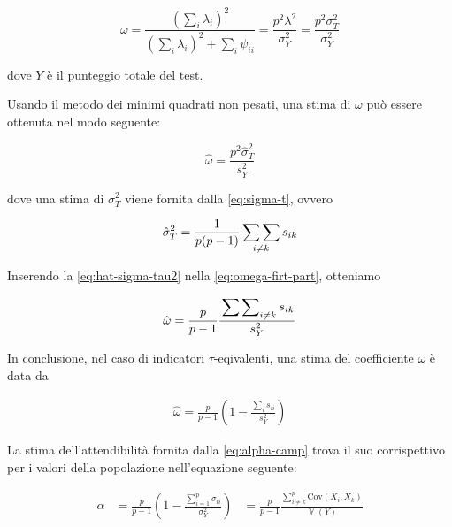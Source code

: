 \documentclass[
  11pt,
]{krantz}
\DeclareMathOperator{\V}{\mathbb{V}} %
\theoremstyle{definition}
\theoremstyle{definition}
\theoremstyle{definition}
\theoremstyle{definition}
\theoremstyle{remark}
\begin{document}
\[
\omega = \frac{\left( \sum_i \lambda_i \right)^2}{\left( \sum_i
    \lambda_i \right)^2  + \sum_i \psi_{ii}} = \frac{p^2 \lambda^2}{\sigma^2_Y} = \frac{p^2 \sigma_T^2}{\sigma_Y^2}
\]

dove \(Y\) è il punteggio totale del test.

Usando il metodo dei minimi quadrati non pesati, una stima di \(\omega\) può essere ottenuta nel modo seguente:

\begin{equation}
\hat{\omega} = \frac{p^2 \hat{\sigma}_T^2}{s_Y^2}
\label{eq:omega-firt-part}
\end{equation}

dove una stima di \(\sigma_T^2\) viene fornita dalla \eqref{eq:sigma-t}, ovvero

\begin{equation}
\hat{\sigma}_T^2 = \frac{1}{p(p-1)} \sideset{}{} {\sum \sum}_{i \neq k} s_{ik}
\label{eq:hat-sigma-tau2}
\end{equation}

Inserendo la \eqref{eq:hat-sigma-tau2} nella \eqref{eq:omega-firt-part}, otteniamo

\begin{equation}
\hat{\omega} = \frac{p}{p-1}\frac{\sideset{}{} {\sum \sum}_{i \neq k} s_{ik}}{s_Y^2}
\end{equation}

In conclusione, nel caso di indicatori \(\tau\)-eqivalenti, una stima del coefficiente \(\omega\) è data da

\begin{equation}
\begin{aligned}
\hat{\omega}
 = \frac{p}{p-1}\left(1-\frac{\sum_i s_{ii}}{s_Y^2}\right)
\label{eq:alpha-camp}
\end{aligned}
\end{equation}

La stima dell'attendibilità fornita dalla \eqref{eq:alpha-camp} trova il suo corrispettivo per i valori della popolazione nell'equazione seguente:

\begin{equation}
\begin{aligned}
\alpha &= \frac{p}{p-1}\left(1-\frac{\sum_{i=1}^p \sigma_{ii}}{\sigma_Y^2}\right)
&= \frac{p}{p-1}\frac{\sum_{i\neq k}^p \mbox{Cov}(X_i, X_k)}{\V(Y)}
\label{eq:alpha-pop}
\end{aligned}
\end{equation}
\end{document}
